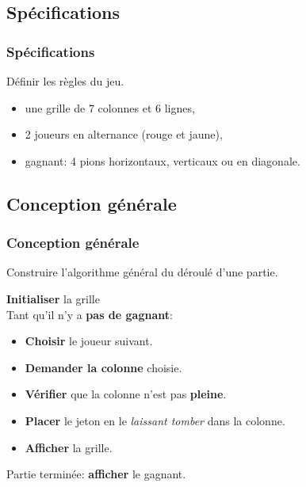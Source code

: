 \documentclass[svgnames,11pt]{beamer}
\begin{document}
\subsection{Spécifications}
\begin{frame}
    \frametitle{Spécifications}

    \begin{aretenir}[Rôle]
    Définir les règles du jeu.
    \end{aretenir}

\end{frame}
\begin{frame}

    \begin{itemize}
        \item une grille de 7 colonnes et 6 lignes,
        \item 2 joueurs en alternance (rouge et jaune),
        \item gagnant: 4 pions horizontaux, verticaux ou en diagonale.
    \end{itemize}

\end{frame}
\subsection{Conception générale}
\begin{frame}
    \frametitle{Conception générale}

    \begin{aretenir}[Rôle]
    Construire l'algorithme général du déroulé d'une partie.
    \end{aretenir}

\end{frame}
\begin{frame}

    \textbf{Initialiser} la grille\\
    Tant qu'il n'y a \textbf{pas de gagnant}:
    \begin{itemize}
        \item \textbf{Choisir} le joueur suivant.
        \item \textbf{Demander la colonne} choisie.
        \item \textbf{Vérifier} que la colonne n'est pas \textbf{pleine}.
        \item \textbf{Placer} le jeton en le \emph{laissant tomber} dans la colonne.
        \item \textbf{Afficher} la grille.
    \end{itemize}
    Partie terminée: \textbf{afficher} le gagnant.
\end{frame}
\end{document}
